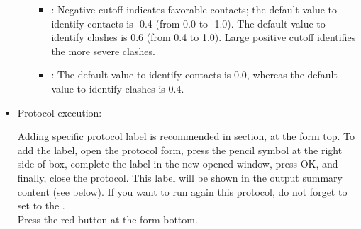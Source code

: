 \begin{itemize}
\begin{itemize}
            \begin{itemize}
            \item {}: Negative cutoff indicates favorable contacts; the default value to identify contacts is -0.4 (from 0.0 to -1.0). The default value to identify clashes is 0.6 (from 0.4 to 1.0). Large positive cutoff identifies the more severe clashes.
            \item {}: The default value to identify contacts is 0.0, whereas the default value to identify clashes is 0.4.
            \end{itemize}

    \end{itemize}

  \item Protocol execution:
  
  Adding specific protocol label is recommended in  section, at the form top. To add the label, open the protocol form, press the pencil symbol at the right side of  box, complete the label in the new opened window, press OK, and finally, close the protocol. This label will be shown in the output summary content (see below). If you want to run again this protocol, do not forget to set to  the .\\
  Press the  red button at the form bottom.
  

\end{itemize}
